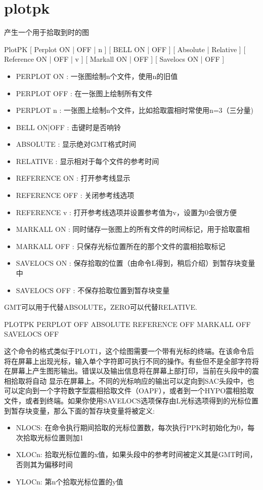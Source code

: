 \section{plotpk}
\label{cmd:plotpk}

产生一个用于拾取到时的图

PlotPK [ Perplot ON | OFF | n ] [ BELL ON | OFF ] [ Absolute | Relative ] [ Reference ON | OFF | v ] [ Markall ON | OFF ] [ Savelocs ON | OFF ]

\begin{itemize}
\item PERPLOT ON : 一张图绘制n个文件，使用n的旧值 
\item PERPLOT OFF : 在一张图上绘制所有文件 
\item PERPLOT n : 一张图上绘制n个文件，比如拾取震相时常使用n=3（三分量) 
\item BELL {ON}|OFF :  击键时是否响铃 
\item ABSOLUTE : 显示绝对GMT格式时间 
\item RELATIVE : 显示相对于每个文件的参考时间 
\item REFERENCE {ON} : 打开参考线显示 
\item REFERENCE OFF : 关闭参考线选项 
\item REFERENCE v : 打开参考线选项并设置参考值为v，设置为0会很方便 
\item MARKALL {ON} : 同时储存一张图上的所有文件的时间标记，用于拾取震相 
\item MARKALL OFF : 只保存光标位置所在的那个文件的震相拾取标记 
\item SAVELOCS {ON} : 保存拾取的位置（由命令L得到，稍后介绍）到暂存块变量中 
\item SAVELOCS OFF :  不保存拾取位置到暂存块变量 
\end{itemize}

GMT可以用于代替ABSOLUTE，ZERO可以代替RELATIVE.

PLOTPK PERPLOT OFF ABSOLUTE REFERENCE OFF MARKALL OFF SAVELOCS OFF

这个命令的格式类似于PLOT1，这个绘图需要一个带有光标的终端。在该命令后将在屏幕上出现光标，输入单个字符即可执行不同的操作。有些但不是全部字符将在屏幕上产生图形输出。错误以及输出信息将在屏幕上部打印，当前在头段中的震相拾取将自动	显示在屏幕上。不同的光标响应的输出可以定向到SAC头段中，也可以定向到一个字符数字型震相拾取文件（OAPF），或者到一个HYPO震相拾取文件，或者到终端。如果你使用SAVELOCS选项保存由L光标选项得到的光标位置到暂存块变量，那么下面的暂存块变量将被定义:
\begin{itemize}
\item NLOCS: 在命令执行期间拾取的光标位置数，每次执行PPK时初始化为0，每次拾取光标位置则加1
\item XLOCn: 拾取光标位置的x值，如果头段中的参考时间被定义其是GMT时间，否则其为偏移时间
\item YLOCn: 第n个拾取光标位置的y值
\end{itemize}

